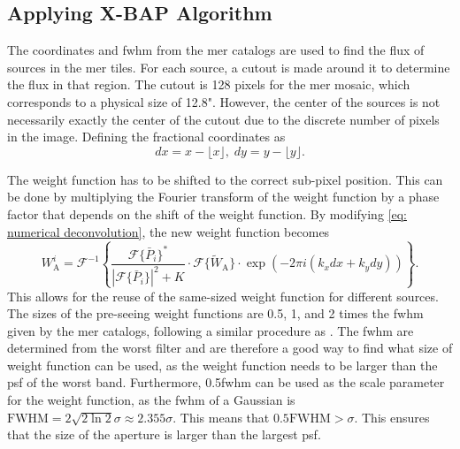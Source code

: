 
\subsection{Applying X-BAP Algorithm}\label{subsec: applying pca-phot algorithm}
The coordinates and \gls{fwhm} from the \gls{mer} catalogs are used to find the flux of sources in the \gls{mer} tiles.
For each source, a cutout is made around it to determine the flux in that region. The cutout is 128 pixels for the \gls{mer} mosaic, which corresponds to a physical size of 12.8". However, the center of the sources is not necessarily exactly the center of the cutout due to the discrete number of pixels in the image. 
Defining the fractional coordinates as
\begin{equation}
    dx = x - \lfloor x\rfloor,\;dy = y - \lfloor y\rfloor.
\end{equation}

The weight function has to be shifted to the correct sub-pixel position. This can be done by multiplying the Fourier transform of the weight function by a phase factor that depends on the shift of the weight function. By modifying \autoref{eq: numerical deconvolution}, the new weight function becomes
\begin{equation}\label{eq: numerical deconvolution v2}
    W^i_\mathrm{A} = \mathcal{F}^{-1}\left\{\frac{\mathcal{F}\{\bar{P}_i\}^*}{|\mathcal{F}\{\bar{P}_i\}|^2+K}\cdot\mathcal{F}\{\tilde{W}_\mathrm{A}\}\cdot\exp(-2\pi i(k_xdx+k_ydy))\right\}.
\end{equation}
This allows for the reuse of the same-sized weight function for different sources. The sizes of the pre-seeing weight functions are 0.5, 1, and 2 times the \gls{fwhm} given by the \gls{mer} catalogs, following a similar procedure as \cite{euclid_collaboration_euclid_2026}. The \gls{fwhm} are determined from the worst filter and are therefore a good way to find what size of weight function can be used, as the weight function needs to be larger than the \gls{psf} of the worst band. Furthermore, 0.5\gls{fwhm} can be used as the scale parameter for the weight function, as the \gls{fwhm} of a Gaussian is $\mathrm{FWHM}=2\sqrt{2\ln2}\sigma\approx2.355\sigma$. This means that $0.5\mathrm{FWHM}>\sigma$. This ensures that the size of the aperture is larger than the largest \gls{psf}.

